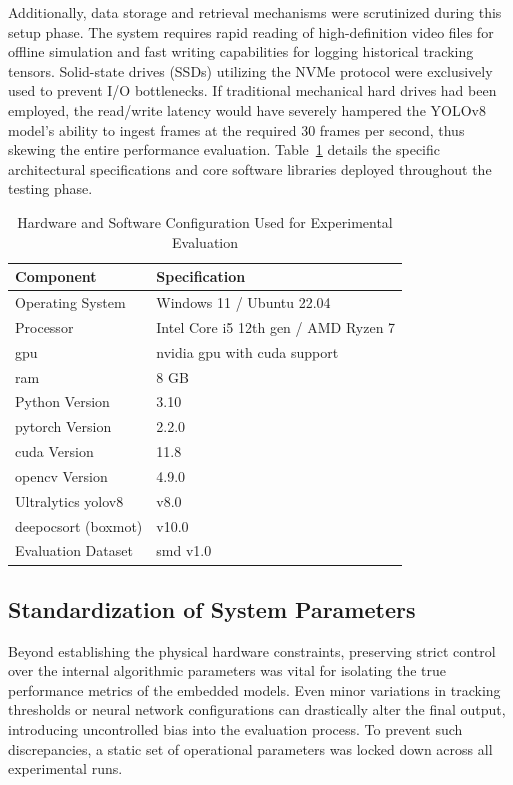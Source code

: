 Additionally, data storage and retrieval mechanisms were scrutinized during this setup phase. The system requires rapid reading of high-definition video files for offline simulation and fast writing capabilities for logging historical tracking tensors. Solid-state drives (SSDs) utilizing the NVMe protocol were exclusively used to prevent I/O bottlenecks. If traditional mechanical hard drives had been employed, the read/write latency would have severely hampered the YOLOv8 model's ability to ingest frames at the required 30 frames per second, thus skewing the entire performance evaluation. Table~\ref{c5:tab:hardware} details the specific architectural specifications and core software libraries deployed throughout the testing phase.

\begin{table}[H]
\centering
\caption{Hardware and Software Configuration Used for Experimental Evaluation}
\label{c5:tab:hardware}
\begin{tabular}{|p{}|p{}|}
\hline
\textbf{Component} & \textbf{Specification}\\
\hline
Operating System & Windows 11 / Ubuntu 22.04\\
\hline
Processor & Intel Core i5 12th gen / AMD Ryzen 7\\
\hline
\gls{gpu} & \gls{nvidia} \gls{gpu} with \gls{cuda} support\\
\hline
\gls{ram} & 8 GB\\
\hline
Python Version & 3.10\\
\hline
\gls{pytorch} Version & 2.2.0\\
\hline
\gls{cuda} Version & 11.8\\
\hline
\gls{opencv} Version & 4.9.0\\
\hline
Ultralytics \gls{yolov8} & v8.0\\
\hline
\gls{deepocsort} (boxmot) & v10.0\\
\hline
Evaluation Dataset & \gls{smd} v1.0\\
\hline
\end{tabular}
\end{table}

\subsection{Standardization of System Parameters}

Beyond establishing the physical hardware constraints, preserving strict control over the internal algorithmic parameters was vital for isolating the true performance metrics of the embedded models. Even minor variations in tracking thresholds or neural network configurations can drastically alter the final output, introducing uncontrolled bias into the evaluation process. To prevent such discrepancies, a static set of operational parameters was locked down across all experimental runs. 

